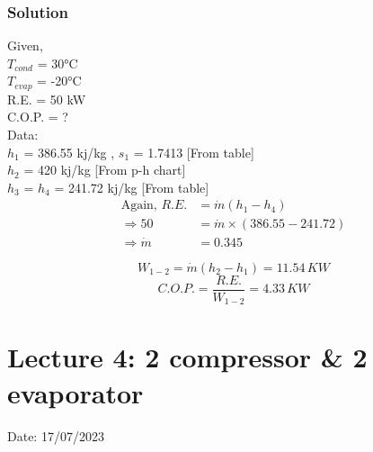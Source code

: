 \documentclass{article}
\begin{document}
\subsubsection*{Solution}
\begin{multicols}{2}
  Given,\\
  $T_{cond}$ = 30°C \\
  $T_{evap}$ = -20°C \\
  R.E. = 50 kW \\
  C.O.P. = ? \\
  Data:\\
  $h_1$ = 386.55 kj/kg , $s_1$ = 1.7413 [From table] \\
  $h_2$ = 420 kj/kg [From p-h chart] \\
  $h_3$ = $h_4$ = 241.72 kj/kg [From table] \\

  \begin{align*}
    \text{Again, } R.E. &= \dot{m} (h_1 - h_4) \\ 
    \Rightarrow 50 &= \dot{m} \times (386.55 - 241.72) \\
    \Rightarrow \dot{m} &= 0.345  
  \end{align*}

  $$W_{1-2} = \dot{m}(h_2-h_1) = 11.54 \, KW$$
  $$C.O.P. = \frac{R.E.}{W_{1-2}} = 4.33 \, KW$$

\end{multicols}
\pagebreak
\section{Lecture 4: 2 compressor \& 2 evaporator}
\hfill Date: 17/07/2023
\end{document}
